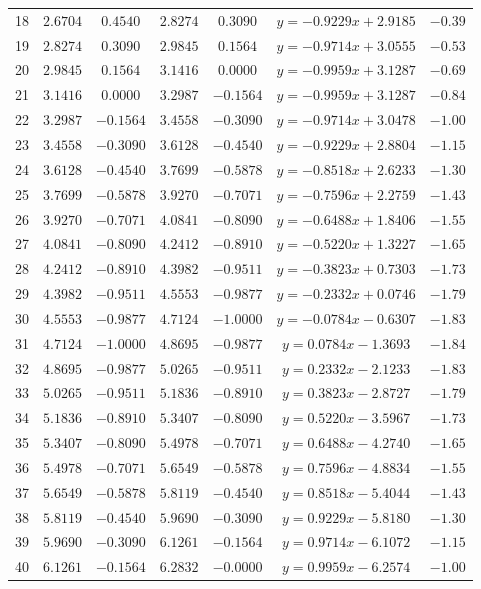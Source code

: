 \documentclass[12pt,a4paper]{report}
\begin{document}
\begin{table}
\begin{center}
\begin{tabular}{c | c c | c c | c | c}
			18 &$2.6704$&$0.4540$&$2.8274$&$0.3090$&$y = -0.9229x+2.9185$&$-0.39$\\
			19 &$2.8274$&$0.3090$&$2.9845$&$0.1564$&$y = -0.9714x+3.0555$&$-0.53$\\
			20 &$2.9845$&$0.1564$&$3.1416$&$0.0000$&$y = -0.9959x+3.1287$&$-0.69$\\
			21 &$3.1416$&$0.0000$&$3.2987$&$-0.1564$&$y = -0.9959x+3.1287$&$-0.84$\\
			22 &$3.2987$&$-0.1564$&$3.4558$&$-0.3090$&$y = -0.9714x+3.0478$&$-1.00$\\
			23 &$3.4558$&$-0.3090$&$3.6128$&$-0.4540$&$y = -0.9229x+2.8804$&$-1.15$\\
			24 &$3.6128$&$-0.4540$&$3.7699$&$-0.5878$&$y = -0.8518x+2.6233$&$-1.30$\\
			25 &$3.7699$&$-0.5878$&$3.9270$&$-0.7071$&$y = -0.7596x+2.2759$&$-1.43$\\
			26 &$3.9270$&$-0.7071$&$4.0841$&$-0.8090$&$y = -0.6488x+1.8406$&$-1.55$\\
			27 &$4.0841$&$-0.8090$&$4.2412$&$-0.8910$&$y = -0.5220x+1.3227$&$-1.65$\\
			28 &$4.2412$&$-0.8910$&$4.3982$&$-0.9511$&$y = -0.3823x+0.7303$&$-1.73$\\
			29 &$4.3982$&$-0.9511$&$4.5553$&$-0.9877$&$y = -0.2332x+0.0746$&$-1.79$\\
			30 &$4.5553$&$-0.9877$&$4.7124$&$-1.0000$&$y = -0.0784x-0.6307$&$-1.83$\\
			31 &$4.7124$&$-1.0000$&$4.8695$&$-0.9877$&$y =  0.0784x-1.3693$&$-1.84$\\
			32 &$4.8695$&$-0.9877$&$5.0265$&$-0.9511$&$y =  0.2332x-2.1233$&$-1.83$\\
			33 &$5.0265$&$-0.9511$&$5.1836$&$-0.8910$&$y =  0.3823x-2.8727$&$-1.79$\\
			34 &$5.1836$&$-0.8910$&$5.3407$&$-0.8090$&$y =  0.5220x-3.5967$&$-1.73$\\
			35 &$5.3407$&$-0.8090$&$5.4978$&$-0.7071$&$y =  0.6488x-4.2740$&$-1.65$\\
			36 &$5.4978$&$-0.7071$&$5.6549$&$-0.5878$&$y =  0.7596x-4.8834$&$-1.55$\\
			37 &$5.6549$&$-0.5878$&$5.8119$&$-0.4540$&$y =  0.8518x-5.4044$&$-1.43$\\
			38 &$5.8119$&$-0.4540$&$5.9690$&$-0.3090$&$y =  0.9229x-5.8180$&$-1.30$\\
			39 &$5.9690$&$-0.3090$&$6.1261$&$-0.1564$&$y =  0.9714x-6.1072$&$-1.15$\\
			40 &$6.1261$&$-0.1564$&$6.2832$&$-0.0000$&$y =  0.9959x-6.2574$&$-1.00$\\
			

\end{tabular}
\end{center}
\end{table}
\end{document}
